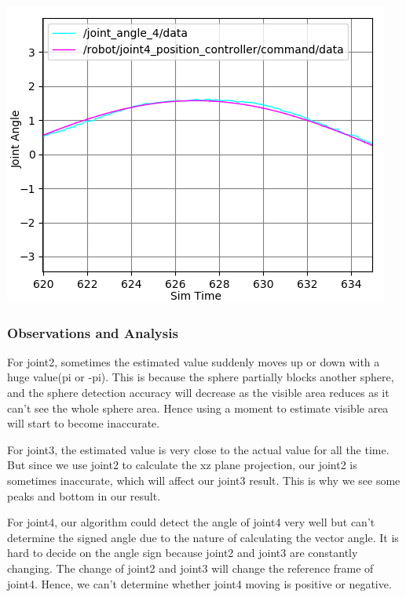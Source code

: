 \documentclass[11pt]{article}
\begin{document}
\begin{center}
\begin{minipage}{0.33\linewidth}
\includegraphics[width=\linewidth]{fig_with_axisname/2.1-joint4.png}
\end{minipage}%
\end{center}



\subsubsection{Observations and Analysis}

For joint2, sometimes the estimated value suddenly moves up or down with a huge value(pi or -pi). This is because the sphere partially blocks another sphere, and the sphere detection accuracy will decrease as the visible area reduces as it can't see the whole sphere area. Hence using a moment to estimate visible area will start to become inaccurate.

For joint3, the estimated value is very close to the actual value for all the time. But since we use joint2 to calculate the xz plane projection, our joint2 is sometimes inaccurate, which will affect our joint3 result. This is why we see some peaks and bottom in our result.

For joint4, our algorithm could detect the angle of joint4 very well but can't determine the signed angle due to the nature of calculating the vector angle. It is hard to decide on the angle sign because joint2 and joint3 are constantly changing. The change of joint2 and joint3 will change the reference frame of joint4. Hence, we can't determine whether joint4 moving is positive or negative.
\end{document}
